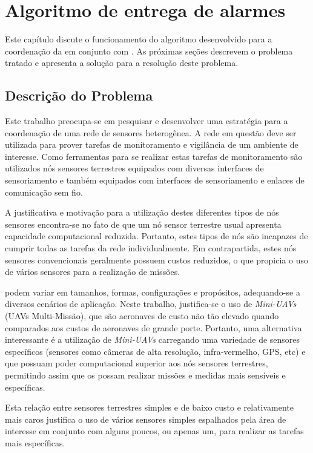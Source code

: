 \newpage\section{Algoritmo de entrega de alarmes}
\label{chap:Desenvolvimento}

Este capítulo discute o funcionamento do algoritmo desenvolvido para a coordenação da \rssf em conjunto com 
\vants. As próximas seções descrevem o problema tratado e apresenta a solução para a resolução deste problema.


\subsection{Descrição do Problema}

Este trabalho preocupa-se em pesquisar e desenvolver uma estratégia para a
coordenação de uma rede de sensores heterogênea. A rede em questão deve ser
utilizada para prover tarefas de monitoramento e vigilância de um ambiente de
interesse. Como ferramentas para se realizar estas tarefas de monitoramento são
utilizados nós sensores terrestres equipados com diversas interfaces de
sensoriamento e \vants também equipados com interfaces de sensoriamento e
enlaces de comunicação sem fio.

A justificativa e motivação para a utilização destes diferentes tipos de nós
sensores encontra-se no fato de que um nó sensor terrestre usual apresenta
capacidade computacional reduzida. Portanto, estes tipos de nós são incapazes de
cumprir todas as tarefas da rede individualmente. Em contrapartida, estes nós
sensores convencionais geralmente possuem custos reduzidos, o que propicia o uso
de vários sensores para a realização de missões. 

\uavs podem variar em tamanhos, formas, configurações e propósitos, adequando-se
a diversos cenários de aplicação. Neste trabalho, justifica-se o uso de
\emph{Mini-UAVs} (UAVs Multi-Missão), que são aeronaves de custo não tão elevado
quando comparados aos custos de aeronaves de grande porte. Portanto, uma
alternativa interessante é a utilização de \emph{Mini-UAVs} carregando uma
variedade de sensores específicos (sensores como câmeras de alta resolução,
infra-vermelho, GPS, etc) e que possuam poder computacional superior aos nós
sensores terrestres, permitindo assim que os \vants possam realizar missões e
medidas mais sensíveis e específicas.

Esta relação entre sensores terrestres simples e de baixo custo e \vants
relativamente mais caros justifica o uso de vários sensores simples espalhados
pela área de interesse em conjunto com alguns poucos, ou apenas um, \vant para
realizar as tarefas mais específicas. 

